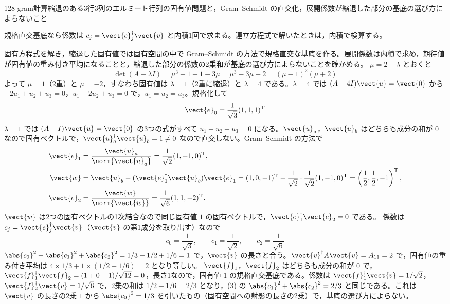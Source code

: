 \documentclass[uplatex,dvipdfmx,a4paper,11pt]{jsarticle}
\begin{document}
\begin{mondai}{128-gram}{計算}{縮退のある3行3列のエルミート行列の固有値問題と，Gram--Schmidt の直交化，展開係数が縮退した部分の基底の選び方によらないこと}
\begin{kizuki}
\item 規格直交基底なら係数は $c_{j}=\vect{e}_{j}^{\dagger}\vect{v}$ と内積1回で求まる。連立方程式で解いたときは，内積で検算する。
\end{kizuki}
\begin{tadashii}
\houshin 固有方程式を解き，縮退した固有値では固有空間の中で Gram--Schmidt の方法で規格直交な基底を作る。展開係数は内積で求め，期待値が固有値の重み付き平均になることと，縮退した部分の係数の2乗和が基底の選び方によらないことを確かめる。
\keisan
{} $\mu=2-\lambda$ とおくと
\[ \det(A-\lambda I)=\mu^{3}+1+1-3\mu=\mu^{3}-3\mu+2=(\mu-1)^{2}(\mu+2) \]
よって $\mu=1$（2重）と $\mu=-2$，すなわち固有値は $\lambda=1$（2重に縮退）と $\lambda=4$ である。$\lambda=4$ では $(A-4I)\vect{u}=\vect{0}$ から $-2u_{1}+u_{2}+u_{3}=0$，$u_{1}-2u_{2}+u_{3}=0$ で，$u_{1}=u_{2}=u_{3}$。規格化して
\[ \vect{e}_{0}=\frac{1}{\sqrt{3}}(1,1,1)^{\mathrm{T}} \]
 $\lambda=1$ では $(A-I)\vect{u}=\vect{0}$ の3つの式がすべて $u_{1}+u_{2}+u_{3}=0$ になる。$\vect{u}_{a}$，$\vect{u}_{b}$ はどちらも成分の和が $0$ なので固有ベクトルで，$\vect{u}_{a}^{\dagger}\vect{u}_{b}=1\neq0$ なので直交しない。Gram--Schmidt の方法で
\begin{align*}
  \vect{e}_{1}&=\frac{\vect{u}_{a}}{\norm{\vect{u}_{a}}}=\frac{1}{\sqrt{2}}(1,-1,0)^{\mathrm{T}},\\
  \vect{w}&=\vect{u}_{b}-(\vect{e}_{1}^{\dagger}\vect{u}_{b})\vect{e}_{1}=(1,0,-1)^{\mathrm{T}}-\frac{1}{\sqrt{2}}\cdot\frac{1}{\sqrt{2}}(1,-1,0)^{\mathrm{T}}=\left(\frac{1}{2},\frac{1}{2},-1\right)^{\mathrm{T}},\\
  \vect{e}_{2}&=\frac{\vect{w}}{\norm{\vect{w}}}=\frac{1}{\sqrt{6}}(1,1,-2)^{\mathrm{T}}.
\end{align*}
$\vect{w}$ は2つの固有ベクトルの1次結合なので同じ固有値 $1$ の固有ベクトルで，$\vect{e}_{1}^{\dagger}\vect{e}_{2}=0$ である。
 係数は $c_{j}=\vect{e}_{j}^{\dagger}\vect{v}$（$\vect{v}$ の第1成分を取り出す）なので
\[ c_{0}=\frac{1}{\sqrt{3}},\qquad c_{1}=\frac{1}{\sqrt{2}},\qquad c_{2}=\frac{1}{\sqrt{6}} \]
$\abs{c_{0}}^{2}+\abs{c_{1}}^{2}+\abs{c_{2}}^{2}=1/3+1/2+1/6=1$ で，$\vect{v}$ の長さと合う。$\vect{v}^{\dagger}A\vect{v}=A_{11}=2$ で，固有値の重み付き平均は $4\times1/3+1\times(1/2+1/6)=2$ となり等しい。
 $\vect{f}_{1}$，$\vect{f}_{2}$ はどちらも成分の和が $0$ で，$\vect{f}_{1}^{\dagger}\vect{f}_{2}=(1+0-1)/\sqrt{12}=0$，長さ1なので，固有値 $1$ の規格直交基底である。係数は $\vect{f}_{1}^{\dagger}\vect{v}=1/\sqrt{2}$，$\vect{f}_{2}^{\dagger}\vect{v}=1/\sqrt{6}$ で，2乗の和は $1/2+1/6=2/3$ となり，(3) の $\abs{c_{1}}^{2}+\abs{c_{2}}^{2}=2/3$ と同じである。これは $\vect{v}$ の長さの2乗 $1$ から $\abs{c_{0}}^{2}=1/3$ を引いたもの（固有空間への射影の長さの2乗）で，基底の選び方によらない。

\end{tadashii}
\end{mondai}
\end{document}

